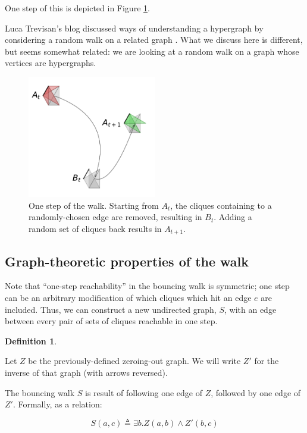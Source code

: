 \documentclass[12pt]{article}
\theoremstyle{definition}
\newtheorem{defn}{Definition}[section]
\begin{document}
One step of this is depicted in Figure \ref{fig:boing}.

Luca Trevisan's blog discussed ways of understanding a hypergraph by
considering a random walk on a related graph
\cite{luca_trevisan_blog_random_walks_1}.
What we discuss here is different, but seems somewhat related:
we are looking at a random walk on a graph whose vertices are
hypergraphs.

\begin{figure}

\centering

\includegraphics[width=0.5\textwidth]{bounce.pdf}

\caption{
One step of the walk. Starting from $A_t$, the cliques containing 
to a randomly-chosen edge are removed, resulting in $B_t$.
Adding a random set of cliques back results in $A_{t+1}$.
}
\label{fig:boing}

\end{figure}

\subsection{Graph-theoretic properties of the walk}
Note that ``one-step reachability'' in the bouncing walk is symmetric;
one step can be an arbitrary modification of which cliques which hit
an edge $e$ are included.
Thus, we can construct a new undirected graph, $S$, with an edge between every
pair of sets of cliques reachable in one step.

\begin{defn} \label{def:bouncingWalk}

Let $Z$ be the previously-defined zeroing-out graph. We will write $Z'$ for
the inverse of that graph (with arrows reversed).

The bouncing walk $S$ is result of following one edge of $Z$, followed by one
edge of $Z'$. Formally, as a relation:

\[
S(a,c) \triangleq \exists b. Z(a,b) \land Z'(b,c)
\]

\end{defn}
\end{document}
